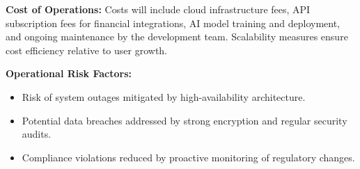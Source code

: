 \textbf{Cost of Operations:}
Costs will include cloud infrastructure fees, API subscription fees for financial integrations, AI model training and deployment, and ongoing maintenance by the development team. Scalability measures ensure cost efficiency relative to user growth.

\textbf{Operational Risk Factors:}
\begin{itemize}
    \item Risk of system outages mitigated by high-availability architecture.
    \item Potential data breaches addressed by strong encryption and regular security audits.
    \item Compliance violations reduced by proactive monitoring of regulatory changes.
\end{itemize}



